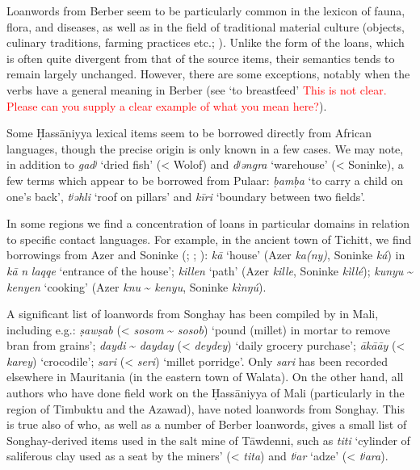 \documentclass[output=paper]{langsci/langscibook}
\begin{document}
Loanwords from Berber seem to be particularly common in the lexicon of fauna, flora, and diseases, as well as in the field of traditional material culture (objects, culinary traditions, farming practices etc.; \citealt{Taine-Cheikh2010lexiques,Taine-Cheikh2014}). Unlike the form of the loans, which is often quite divergent from that of the source items, their semantics tends to remain largely unchanged. However, there are some exceptions, notably when the verbs have a general meaning in Berber (see `to breastfeed' \textcolor{red}{This is not clear. Please can you supply a clear example of what you mean here?}). 


Some Ḥassāniyya lexical items seem to be borrowed directly from African languages, though the precise origin is only known in a few cases. We may note, in addition to \textit{gadʲ} ‘dried fish’ (< Wolof) and \textit{dʲəngra} ‘warehouse’ (< Soninke), a few terms which appear to be borrowed from Pulaar: \textit{ḅamḅa} ‘to carry a child on one’s back’, \textit{tʲəhli} ‘roof on pillars’ and \textit{kīri} ‘boundary between two fields’.

In some regions we find a concentration of loans in particular domains in relation to specific contact languages. For example, in the ancient town of Tichitt, we find borrowings from Azer and Soninke (\citealt{Jacques-Meunié1961}; \citealt{Monteil1939}; \citealt{Diagana2013}): \textit{kā} ‘house’ (Azer \textit{ka(ny)}, Soninke \textit{ká}) in \textit{kā} \textit{n} \textit{laqqe} ‘entrance of the house’; \textit{killen} ‘path’ (Azer \textit{kille}, Soninke \textit{kìllé}); \textit{kunyu} \~{} \textit{kenyen} ‘cooking’ (Azer \textit{knu} \~{} \textit{kenyu}, Soninke \textit{kìnŋú}).

A significant list of loanwords from Songhay has been compiled by \citet{Heath2004} in Mali, including e.g.: \textit{ṣawṣab} (< \textit{sosom} \~{} \textit{sosob}) ‘pound (millet) in mortar to remove bran from grains’; \textit{daydi} \~{} \textit{dayday} (< \textit{deydey}) ‘daily grocery purchase’; \textit{ākā{\R}āy} (< \textit{karey}) ‘crocodile’; \textit{sari} (< \textit{seri}) ‘millet porridge’. Only \textit{sari} has been recorded elsewhere in Mauritania (in the eastern town of Walata). On the other hand, all authors who have done field work on the Ḥassāniyya of Mali (particularly in the region of Timbuktu and the Azawad), have noted loanwords from Songhay. This is true also of \citet{Clauzel1960} who, as well as a number of Berber loanwords, gives a small list of Songhay-derived items used in the salt mine of Tāwdenni, such as \textit{titi} ‘cylinder of saliferous clay used as a seat by the miners’ (< \textit{tita}) and \textit{tʲar} ‘adze’ (< \textit{tʲara}).
\end{document}
